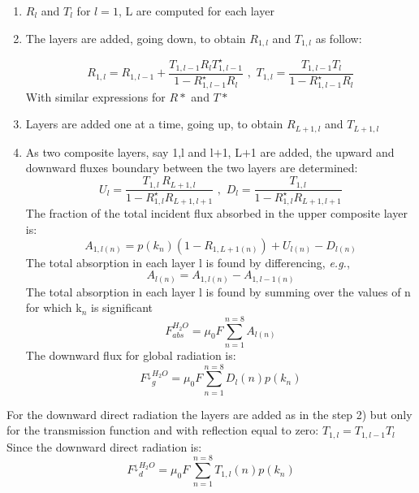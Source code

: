 \begin{enumerate}
\item $R_{l} $ and $T_{l}$ for $l = 1$, L are computed for each layer
\item The layers are added, going down, to obtain $R_{1,l}$ and $T_{1,l}$ as follow:

\begin{equation}
R_{1,l}=R_{1,l-1}+\frac{T_{1,l-1}R_{l}T_{1,l-1}^{\star }}{1-R_{1,l-1}^{\star
}R_{l}}\, \, ,\, \, T_{1,l}=\frac{T_{1,l-1}T_{l}}{1-R_{1,l-1}^{\star }R_{l}}
\end{equation}
With similar expressions for $R*$ and $T*$
\item Layers are added one at a time, going up, to obtain $R_{L+1,l}$ and $T_{L+1,l}$
\item As two composite layers, say 1,l and l$+$1, L$+$1 are added, the upward and downward fluxes boundary between the two layers are determined:
\begin{equation}
U_{l}=\frac{T_{1,l}{\, R}_{L+1,l}}{1-R_{1,l}^{\star }R_{L+1,l+1}}\, \, ,\, \,
D_{l}=\frac{T_{1,l}}{1-R_{1,l}^{\star }R_{L+1,l+1}}
\end{equation}
The fraction of the total incident flux absorbed in the upper composite
layer is:
\begin{equation}
A_{1,l(n)}=p\left( k_{n} \right)\left( 1-R_{1,L+1(n)}
\right)+U_{l(n)}-D_{l(n)}
\end{equation}
The total absorption in each layer l is found by differencing, \emph{e.g.},
\begin{equation}
A_{l(n)}=A_{1,l(n)}-A_{1,l-1(n)}
\end{equation}
The total absorption in each layer l is found by summing over the values of
n for which k$_{n}$ is significant
\begin{equation}
F_{abs}^{H_{2}O}=\mu_{0}F\sum\limits_{n=1}^{n=8} A_{l(n)}
\end{equation}
The downward flux for global radiation is:
\begin{equation}
{F^\downarrow }_{g}^{H_{2}O}=\mu_{0}F\sum\limits_{n=1}^{n=8} {D_{l}\left( n
\right)p\left( k_{n} \right)}
\end{equation}
\end{enumerate}
For the downward direct radiation the layers are added as in the step 2) but
only for the transmission function and with reflection equal to zero:
$T_{1,l}=T_{1,l-1}T_{l}$ Since the downward direct radiation is:
\begin{equation}
{F^\downarrow }_{d}^{H_{2}O}=\mu_{0}F\, \sum\limits_{n=1}^{n=8} T_{1,l} \left(
n \right)p(k_{n})
\end{equation}

